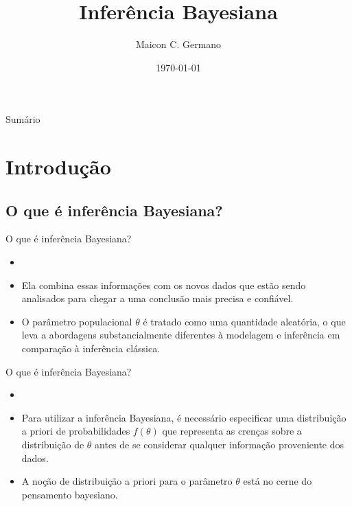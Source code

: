 \documentclass{beamer}
\title{Inferência Bayesiana}
\author{Maicon C. Germano}
\institute{IBB UNESP}
\date{\today}
\theoremstyle{definition}
\begin{document}
\begin{frame}
  \titlepage
\end{frame}

\begin{frame}{Sumário}
  \tableofcontents
\end{frame}

\section{Introdução}

\subsection{O que é inferência Bayesiana?}
\begin{frame}{O que é inferência Bayesiana?}
\begin{itemize}
\item {}
\vspace{0.2cm}
\item Ela combina essas informações com os novos dados que estão sendo analisados para chegar a uma conclusão mais precisa e confiável.
\vspace{0.2cm}
\item O parâmetro populacional $\theta$ é tratado como uma quantidade aleatória, o que leva a abordagens substancialmente diferentes à modelagem e inferência em comparação à inferência clássica.
\end{itemize}
\end{frame}

\begin{frame}{O que é inferência Bayesiana?}
\begin{itemize}
\item {}
\vspace{0.2cm}
\item Para utilizar a inferência Bayesiana, é necessário especificar uma distribuição a priori de probabilidades $f(\theta)$ que representa as crenças sobre a distribuição de $\theta$ antes de se considerar qualquer informação proveniente dos dados.
\vspace{0.2cm}
\item A noção de distribuição a priori para o parâmetro $\theta$ está no cerne do pensamento bayesiano.

\end{itemize}
    
\end{frame}
\end{document}
